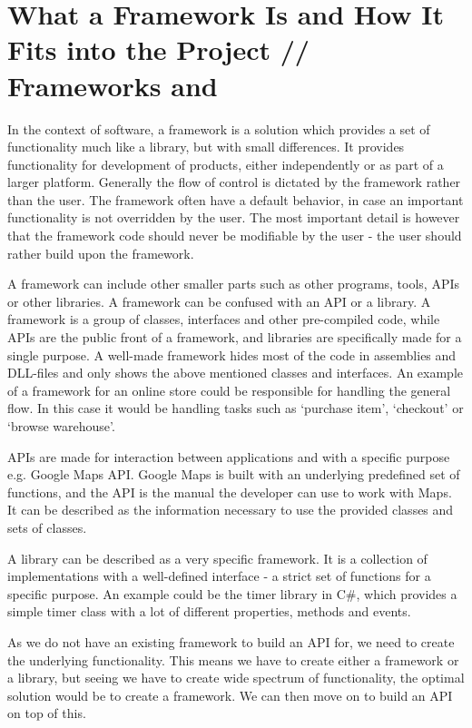 \section{What a Framework Is and How It Fits into the Project // Frameworks and }

In the context of software, a framework is a solution which provides a set of functionality much like a library, but with small differences. It provides functionality for development of products, either independently or as part of a larger platform.
Generally the flow of control is dictated by the framework rather than the user. The framework often have a default behavior, in case an important functionality is not overridden by the user. The most important detail is however that the framework code should never be modifiable by the user - the user should rather build upon the framework. \cite{framework}

A framework can include other smaller parts such as other programs, tools, APIs or other libraries. A framework can be confused with an API or a library. A framework is a group of classes, interfaces and other pre-compiled code, while APIs are the public front of a framework, and libraries are specifically made for a single purpose. A well-made framework hides most of the code in assemblies and DLL-files and only shows the above mentioned classes and interfaces. An example of a framework for an online store could be responsible for handling the general flow. In this case it would be handling tasks such as `purchase item', `checkout' or `browse warehouse'.

APIs are made for interaction between applications and with a specific purpose e.g. Google Maps API\cite{google-maps-api}. Google Maps is built with an underlying predefined set of functions, and the API is the manual the developer can use to work with Maps. It can be described as the information necessary to use the provided classes and sets of classes.

A library can be described as a very specific framework. It is a collection of implementations with a well-defined interface - a strict set of functions for a specific purpose. An example could be the timer library in C\#\cite{net-timer}, which provides a simple timer class with a lot of different properties, methods and events.

As we do not have an existing framework to build an API for, we need to create the underlying functionality. This means we have to create either a framework or a library, but seeing we have to create wide spectrum of functionality, the optimal solution would be to create a framework. We can then move on to build an API on top of this.